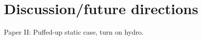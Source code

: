 \section{Discussion/future directions}
\label{sec:discuss}

Paper II: Puffed-up static case, turn on hydro.


